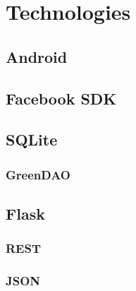 \chapter{Technologies}

\section{Android}

\section{Facebook SDK}

\section{SQLite}

\subsection{GreenDAO}

\section{Flask}

\subsection{REST}

\subsection{JSON}